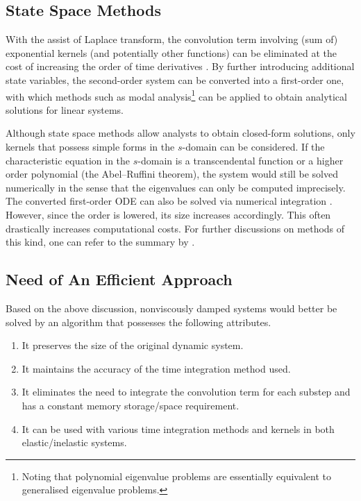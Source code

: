 \subsection{State Space Methods}
With the assist of Laplace transform, the convolution term involving (sum of) exponential kernels (and potentially other functions) can be eliminated at the cost of increasing the order of time derivatives \citep[see, e.g.,][]{Wu2019}. By further introducing additional state variables, the second-order system  can be converted into a first-order one, with which methods such as modal analysis\footnote{Noting that polynomial eigenvalue problems are essentially equivalent to generalised eigenvalue problems.} can be applied to obtain analytical solutions for linear systems.

Although state space methods allow analysts to obtain closed-form solutions, only kernels that possess simple forms in the $s$-domain can be considered. If the characteristic equation in the $s$-domain is a transcendental function or a higher order polynomial (the Abel--Ruffini theorem), the system would still be solved numerically in the sense that the eigenvalues can only be computed imprecisely. The converted first-order ODE can also be solved via numerical integration \citep{Adhikari2004}. However, since the order is lowered, its size increases accordingly. This often drastically increases computational costs. For further discussions on methods of this kind, one can refer to the summary by \citet[][\S~1.3.1]{Adhikari2014}.
\subsection{Need of An Efficient Approach}
Based on the above discussion, nonviscously damped systems would better be solved by an algorithm that possesses the following attributes.
\begin{Objective}
\begin{enumerate}
\item It preserves the size of the original dynamic system.
\item It maintains the accuracy of the time integration method used.
\item It eliminates the need to integrate the convolution term for each substep and has a constant memory storage/space requirement.
\item It can be used with various time integration methods and kernels in both elastic/inelastic systems.
\end{enumerate}
\end{Objective}

